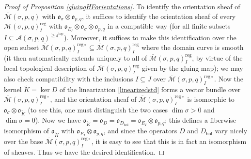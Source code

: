 \documentclass[12pt]{article}
\theoremstyle{definition}
\theoremstyle{remark}
\numberwithin{equation}{subsection}
\newcommand{\s}{\mathfrak s}
\newcommand{\oo}{\mathfrak o}
\newcommand{\ttop}{\mathrm{top}}
\newcommand{\A}{\mathcal A}
\newcommand{\Mbar}{\overline{\mathcal M}}
\newcommand{\reg}{\mathrm{reg}}
\begin{document}
\begin{proof}[Proof of Proposition \ref{gluingHForientations}]
To identify the orientation sheaf of $\Mbar(\sigma,p,q)$ with $\oo_\sigma\otimes\oo_{p,q}$, it suffices to identify the orientation sheaf of every $\Mbar(\sigma,p,q)_I^\reg$ with $\oo_{E_I}\otimes\oo_\sigma\otimes\oo_{p,q}$ in a compatible way (for all finite subsets $I\subseteq\A(\sigma,p,q)^{\geq\s^\ttop}$).  Moreover, it suffices to make this identification over the open subset $\Mbar(\sigma,p,q)_I^{\reg\circ}\subseteq\Mbar(\sigma,p,q)_I^\reg$ where the domain curve is smooth (it then automatically extends uniquely to all of $\Mbar(\sigma,p,q)_I^\reg$, by virtue of the local topological description of $\Mbar(\sigma,p,q)_I^\reg$ given by the gluing map); we may also check compatibility with the inclusions $I\subseteq J$ over $\Mbar(\sigma,p,q)_I^{\reg\circ}$.  Now the kernel $\tilde K=\ker D$ of the linearization \eqref{linearizedstd} forms a vector bundle over $\Mbar(\sigma,p,q)_I^{\reg\circ}$, and the orientation sheaf of $\Mbar(\sigma,p,q)_I^{\reg\circ}$ is isomorphic to $\oo_\sigma\otimes\oo_{\tilde K}$ (to see this, one must distinguish the two cases $\dim\sigma>0$ and $\dim\sigma=0$).  Now we have $\oo_{\tilde K}=\oo_D=\oo_{D_\text{hol}}=\oo_{E_I}\otimes\oo_{p,q}$; this defines a fiberwise isomorphism of $\oo_{\tilde K}$ with $\oo_{E_I}\otimes\oo_{p,q}$, and since the operators $D$ and $D_\text{hol}$ vary nicely over the base $\Mbar(\sigma,p,q)_I^{\reg\circ}$, it is easy to see that this is in fact an isomorphism of sheaves.  Thus we have the desired identification.


\end{proof}
\end{document}
